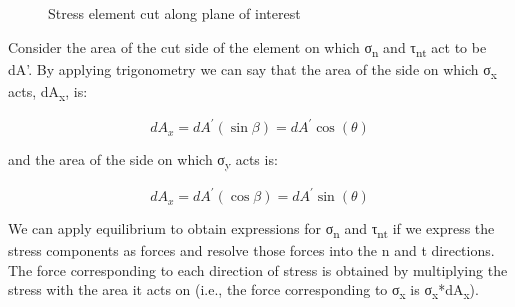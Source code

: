 \documentclass[
  letterpaper,
  DIV=11,
  numbers=noendperiod]{scrreprt}
\theoremstyle{definition}
\theoremstyle{remark}
\begin{document}
\begin{figure}


\caption{\label{fig-12.3}Stress element cut along plane of interest}

\end{figure}%

Consider the area of the cut side of the element on which
σ\textsubscript{n} and τ\textsubscript{nt} act to be dA'. By applying
trigonometry we can say that the area of the side on which
σ\textsubscript{x} acts, dA\textsubscript{x}, is:

\[
d A_x=d A^{\prime}(\sin \beta)=d A^{\prime} \cos (\theta)
\]

and the area of the side on which σ\textsubscript{y} acts is:

\[
d A_x=d A^{\prime}(\cos \beta)=d A^{\prime} \sin (\theta)
\]

We can apply equilibrium to obtain expressions for σ\textsubscript{n}
and τ\textsubscript{nt} if we express the stress components as forces
and resolve those forces into the n and t directions. The force
corresponding to each direction of stress is obtained by multiplying the
stress with the area it acts on (i.e., the force corresponding to
σ\textsubscript{x} is σ\textsubscript{x}*dA\textsubscript{x}).
\end{document}
